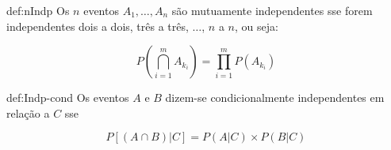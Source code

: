 \begin{theo}{def:nIndp}\label{def:nIndp}
    Os $n$ eventos $A_1,\dots, A_n$ são mutuamente independentes sse forem independentes dois a dois, três a três, $\dots$, $n$ a $n$, ou seja:
    
    \vspace{-0.75 em}
    $$
        P\left(\bigcap_{i=1}^{m} A_{k_i}\right) = \prod_{i=1}^{m} P(A_{k_i})
    $$

\end{theo}

\begin{theo}{def:Indp-cond}\label{def:Indp-cond}
    Os eventos $A$ e $B$ dizem-se condicionalmente independentes em relação a $C$ sse
    
    \vspace{-0.75 em}
    $$
        P[(A \cap B) | C] = P(A | C) \times P(B | C)
    $$
\end{theo}

